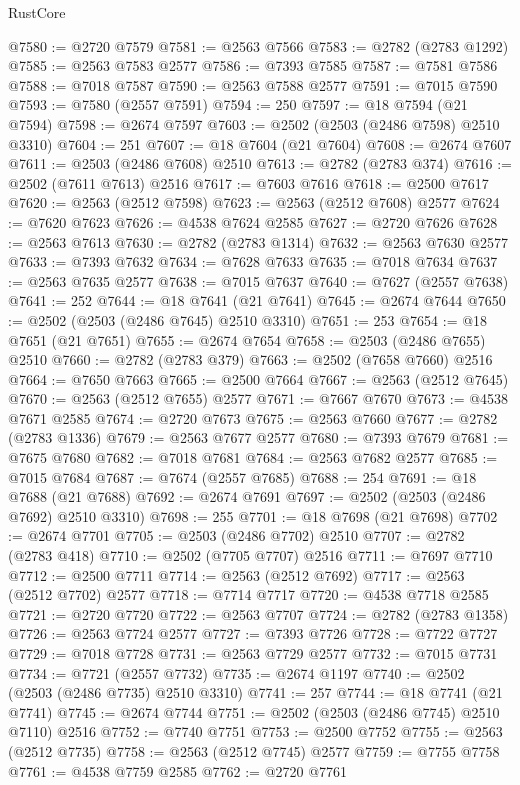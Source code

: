 \begin{lexlean}{RustCore}
\begin{coremodule}
@7580 := @2720 @7579
@7581 := @2563 @7566
@7583 := @2782 (@2783 @1292)
@7585 := @2563 @7583 @2577
@7586 := @7393 @7585
@7587 := @7581 @7586
@7588 := @7018 @7587
@7590 := @2563 @7588 @2577
@7591 := @7015 @7590
@7593 := @7580 (@2557 @7591)
@7594 := 250
@7597 := @18 @7594 (@21 @7594)
@7598 := @2674 @7597
@7603 := @2502 (@2503 (@2486 @7598) @2510 @3310)
@7604 := 251
@7607 := @18 @7604 (@21 @7604)
@7608 := @2674 @7607
@7611 := @2503 (@2486 @7608) @2510
@7613 := @2782 (@2783 @374)
@7616 := @2502 (@7611 @7613) @2516
@7617 := @7603 @7616
@7618 := @2500 @7617
@7620 := @2563 (@2512 @7598)
@7623 := @2563 (@2512 @7608) @2577
@7624 := @7620 @7623
@7626 := @4538 @7624 @2585
@7627 := @2720 @7626
@7628 := @2563 @7613
@7630 := @2782 (@2783 @1314)
@7632 := @2563 @7630 @2577
@7633 := @7393 @7632
@7634 := @7628 @7633
@7635 := @7018 @7634
@7637 := @2563 @7635 @2577
@7638 := @7015 @7637
@7640 := @7627 (@2557 @7638)
@7641 := 252
@7644 := @18 @7641 (@21 @7641)
@7645 := @2674 @7644
@7650 := @2502 (@2503 (@2486 @7645) @2510 @3310)
@7651 := 253
@7654 := @18 @7651 (@21 @7651)
@7655 := @2674 @7654
@7658 := @2503 (@2486 @7655) @2510
@7660 := @2782 (@2783 @379)
@7663 := @2502 (@7658 @7660) @2516
@7664 := @7650 @7663
@7665 := @2500 @7664
@7667 := @2563 (@2512 @7645)
@7670 := @2563 (@2512 @7655) @2577
@7671 := @7667 @7670
@7673 := @4538 @7671 @2585
@7674 := @2720 @7673
@7675 := @2563 @7660
@7677 := @2782 (@2783 @1336)
@7679 := @2563 @7677 @2577
@7680 := @7393 @7679
@7681 := @7675 @7680
@7682 := @7018 @7681
@7684 := @2563 @7682 @2577
@7685 := @7015 @7684
@7687 := @7674 (@2557 @7685)
@7688 := 254
@7691 := @18 @7688 (@21 @7688)
@7692 := @2674 @7691
@7697 := @2502 (@2503 (@2486 @7692) @2510 @3310)
@7698 := 255
@7701 := @18 @7698 (@21 @7698)
@7702 := @2674 @7701
@7705 := @2503 (@2486 @7702) @2510
@7707 := @2782 (@2783 @418)
@7710 := @2502 (@7705 @7707) @2516
@7711 := @7697 @7710
@7712 := @2500 @7711
@7714 := @2563 (@2512 @7692)
@7717 := @2563 (@2512 @7702) @2577
@7718 := @7714 @7717
@7720 := @4538 @7718 @2585
@7721 := @2720 @7720
@7722 := @2563 @7707
@7724 := @2782 (@2783 @1358)
@7726 := @2563 @7724 @2577
@7727 := @7393 @7726
@7728 := @7722 @7727
@7729 := @7018 @7728
@7731 := @2563 @7729 @2577
@7732 := @7015 @7731
@7734 := @7721 (@2557 @7732)
@7735 := @2674 @1197
@7740 := @2502 (@2503 (@2486 @7735) @2510 @3310)
@7741 := 257
@7744 := @18 @7741 (@21 @7741)
@7745 := @2674 @7744
@7751 := @2502 (@2503 (@2486 @7745) @2510 @7110) @2516
@7752 := @7740 @7751
@7753 := @2500 @7752
@7755 := @2563 (@2512 @7735)
@7758 := @2563 (@2512 @7745) @2577
@7759 := @7755 @7758
@7761 := @4538 @7759 @2585
@7762 := @2720 @7761

\end{coremodule}
\end{lexlean}
